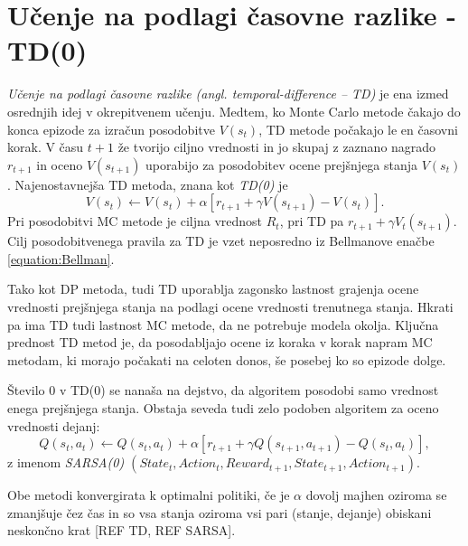 \documentclass[a4paper, oneside, 12pt]{report}
\begin{document}
\section{Učenje na podlagi časovne razlike - TD(0)} \label{subsection:TD0Prediction} %
{\em Učenje na podlagi časovne razlike (angl. temporal-difference -- TD)} je ena izmed osrednjih idej v okrepitvenem učenju. Medtem, ko Monte Carlo metode čakajo do konca epizode za izračun posodobitve $V(s_t)$, TD metode počakajo le en časovni korak. V času $t+1$ že tvorijo ciljno vrednosti in jo skupaj z zaznano nagrado $r_{t+1}$ in oceno $V(s_{t+1})$ uporabijo za posodobitev ocene prejšnjega stanja $V(s_t)$. Najenostavnejša TD metoda, znana kot {\em TD(0)} je
\begin{equation}
V(s_t) \gets V(s_t) + \alpha[r_{t+1} + \gamma V(s_{t+1}) - V(s_t)].
\end{equation}
Pri posodobitvi MC metode je ciljna vrednost $R_t$, pri TD pa $r_{t+1} + \gamma V_t(s_{t+1})$. Cilj posodobitvenega pravila za TD je vzet neposredno iz Bellmanove enačbe \eqref{equation:Bellman}.

Tako kot DP metoda, tudi TD uporablja zagonsko lastnost grajenja ocene vrednosti prejšnjega stanja na podlagi ocene vrednosti trenutnega stanja. Hkrati pa ima TD tudi lastnost MC metode, da ne potrebuje modela okolja. Ključna prednost TD metod je, da posodabljajo ocene iz koraka v korak napram MC metodam, ki morajo počakati na celoten donos, še posebej ko so epizode dolge.


Število 0 v TD(0) se nanaša na dejstvo, da algoritem posodobi samo vrednost enega prejšnjega stanja. Obstaja seveda tudi zelo podoben algoritem za oceno vrednosti dejanj:
\begin{equation}
Q(s_t, a_t) \gets Q(s_t, a_t) + \alpha[r_{t+1} + \gamma Q(s_{t+1}, a_{t+1}) - Q(s_t, a_t)],
\end{equation}
z imenom {\em SARSA(0) $(State_t, Action_t, Reward_{t+1}, State_{t+1}, Action_{t+1})$}.


Obe metodi konvergirata k optimalni politiki, če je $\alpha$ dovolj majhen oziroma se zmanjšuje čez čas in so vsa stanja oziroma vsi pari (stanje, dejanje) obiskani neskončno krat [REF TD, REF SARSA].
\end{document}
